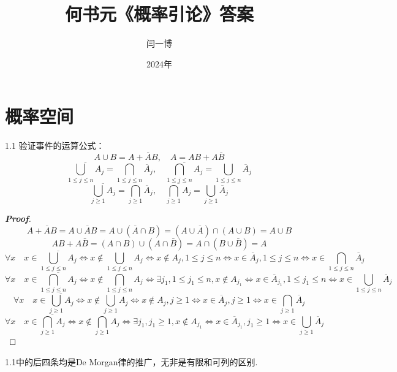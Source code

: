 \documentclass[10pt, a4paper, oneside]{ctexart}
\title{\vspace*{-3cm}\textbf{何书元《概率引论》答案}}
\author{闫一博}
\date{2024年}
\newenvironment{myproof}{\begin{proof}[\bf Proof]}{\end{proof}}
\begin{document}
\maketitle
\tableofcontents 
\newpage 
\section{概率空间}
1.1 验证事件的运算公式：
\[
A\cup B=A+\overline{A}B,\quad A=AB+A\overline{B}
\]
\[\overline {\bigcup\limits_{1 \leqslant j \leqslant n} {{A_j}} }  = \bigcap\limits_{1 \leqslant j \leqslant n} {{{\overline A }_j}},\quad  \overline {\bigcap\limits_{1 \leqslant j \leqslant n} {{A_j}} }  = \bigcup\limits_{1 \leqslant j \leqslant n} {{{\overline A }_j}} \]
\[\overline {\bigcup\limits_{j \geqslant 1} {{A_j}} }  = \bigcap\limits_{j \geqslant 1} {{{\overline A }_j}},\quad  \overline {\bigcap\limits_{j \geqslant 1} {{A_j}} }  = \bigcup\limits_{j \geqslant 1} {{{\overline A }_j}} \]
\begin{myproof}
\[A + \overline A B = A \cup \overline A B = A \cup (\overline A  \cap B) = (A \cup \overline A ) \cap (A \cup B) = A \cup B\]
\[AB + A\bar B = (A \cap B) \cup (A \cap \bar B) = A \cap (B \cup \bar B) = A\]
\[\forall x\quad x \in \overline {\bigcup\limits_{1 \leqslant j \leqslant n} {{A_j}} }  \Leftrightarrow x \notin \bigcup\limits_{1 \leqslant j \leqslant n} {{A_j}}  \Leftrightarrow x \notin {A_j},1 \leqslant j \leqslant n \Leftrightarrow x \in {\overline A _j},1 \leqslant j \leqslant n \Leftrightarrow x \in \bigcap\limits_{1 \leqslant j \leqslant n} {{{\overline A }_j}} \]
\[\forall x\quad x \in \overline {\bigcap\limits_{1 \leqslant j \leqslant n} {{A_j}} }  \Leftrightarrow x \notin \bigcap\limits_{1 \leqslant j \leqslant n} {{A_j}}  \Leftrightarrow \exists {j_1},1 \leqslant {j_1} \leqslant n,x \notin {A_{{j_1}}} \Leftrightarrow x \in {\overline A _{{j_1}}},1 \leqslant {j_1} \leqslant n \Leftrightarrow x \in \bigcup\limits_{1 \leqslant j \leqslant n} {{{\overline A }_j}} \]
\[\forall x\quad x \in \overline {\bigcup\limits_{j \geqslant 1} {{A_j}} }  \Leftrightarrow x \notin \bigcup\limits_{j \geqslant 1} {{A_j}}  \Leftrightarrow x \notin {A_j},j \geqslant 1 \Leftrightarrow x \in \overline {{A}}_j ,j \geqslant 1 \Leftrightarrow x \in \bigcap\limits_{j \geqslant 1} {\overline {A}_j } \]
\[\forall x\quad x \in \overline {\bigcap\limits_{j \geqslant 1} {{A_j}} }  \Leftrightarrow x \notin \bigcap\limits_{j \geqslant 1} {{A_j}}  \Leftrightarrow \exists {j_1},{j_1} \geqslant 1,x \notin {A_{{j_1}}} \Leftrightarrow x \in {\overline A _{{j_1}}},{j_1} \geqslant 1 \Leftrightarrow x \in \bigcup\limits_{j \geqslant 1} {{{\overline A }_j}} \]
\end{myproof}
\begin{remark}
1.1中的后四条均是De Morgan律的推广，无非是有限和可列的区别.
\end{remark}
\end{document}
